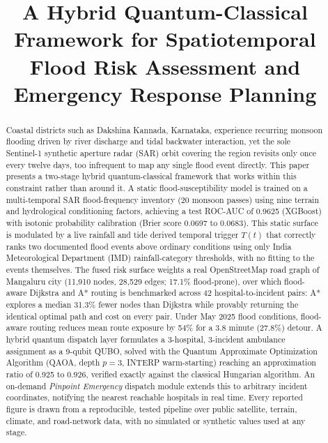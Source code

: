 \documentclass[conference]{IEEEtran}
\begin{document}
\title{A Hybrid Quantum-Classical Framework for Spatiotemporal Flood Risk Assessment and Emergency Response Planning}

\author{
}

\maketitle

\begin{abstract}
Coastal districts such as Dakshina Kannada, Karnataka, experience recurring monsoon flooding driven by river discharge and tidal backwater interaction, yet the sole Sentinel-1 synthetic aperture radar (SAR) orbit covering the region revisits only once every twelve days, too infrequent to map any single flood event directly. This paper presents a two-stage hybrid quantum-classical framework that works within this constraint rather than around it. A static flood-susceptibility model is trained on a multi-temporal SAR flood-frequency inventory (20 monsoon passes) using nine terrain and hydrological conditioning factors, achieving a test ROC-AUC of 0.9625 (XGBoost) with isotonic probability calibration (Brier score 0.0697 to 0.0683). This static surface is modulated by a live rainfall and tide derived temporal trigger $T(t)$ that correctly ranks two documented flood events above ordinary conditions using only India Meteorological Department (IMD) rainfall-category thresholds, with no fitting to the events themselves. The fused risk surface weights a real OpenStreetMap road graph of Mangaluru city (11{,}910 nodes, 28{,}529 edges; 17.1\% flood-prone), over which flood-aware Dijkstra and A* routing is benchmarked across 42 hospital-to-incident pairs: A* explores a median 31.3\% fewer nodes than Dijkstra while provably returning the identical optimal path and cost on every pair. Under May 2025 flood conditions, flood-aware routing reduces mean route exposure by 54\% for a 3.8 minute (27.8\%) detour. A hybrid quantum dispatch layer formulates a 3-hospital, 3-incident ambulance assignment as a 9-qubit QUBO, solved with the Quantum Approximate Optimization Algorithm (QAOA, depth $p=3$, INTERP warm-starting) reaching an approximation ratio of 0.925 to 0.926, verified exactly against the classical Hungarian algorithm. An on-demand \emph{Pinpoint Emergency} dispatch module extends this to arbitrary incident coordinates, notifying the nearest reachable hospitals in real time. Every reported figure is drawn from a reproducible, tested pipeline over public satellite, terrain, climate, and road-network data, with no simulated or synthetic values used at any stage.
\end{abstract}
\end{document}

